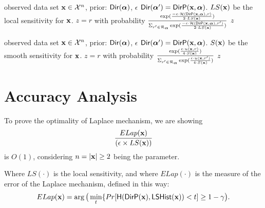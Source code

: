 \documentclass{article}
\begin{document}
%
%
%
%
%
  \begin{algorithm}
  \caption{$\lexpmech$}
  \label{mech:lexpmech}
  \begin{algorithmic}
   observed data set $\textbf{x} \in \mathcal{X}^n$, prior: $\mathsf{Dir}(\boldsymbol{\alpha})$, $\epsilon$
  \STATE {} $\mathsf{Dir}(\boldsymbol{\alpha}')= \mathsf{DirP}(\textbf{x},\boldsymbol{\alpha})$.
  \STATE {} $LS(\textbf{x})$ be the local sensitivity for $\textbf{x}$.
  \STATE {} $z=r$ with probability $\frac
  {\exp(\frac{-\epsilon\cdot \mathcal{H}(\mathsf{DirP}(\textbf{x},\boldsymbol{\alpha}), r)}{2\cdot LS(\textbf{x})})}
{\Sigma_{r' \in \mathcal{R}_{\boldsymbol{\alpha}}}\exp(\frac{-\epsilon\cdot \mathcal{H}(\mathsf{DirP}(\textbf{x},\boldsymbol{\alpha}), r')}{2\cdot LS(\textbf{x})})}$
 $z$
  \end{algorithmic}
  \end{algorithm}
%
%
  \begin{algorithm}
  \caption{$\hexpmech$}
  \label{mech:sexpmech}
  \begin{algorithmic}
  \STATE observed data set $\textbf{x} \in \mathcal{X}^n$, prior: $\mathsf{Dir}(\boldsymbol{\alpha})$, $\epsilon$
  \STATE {} $\mathsf{Dir}(\boldsymbol{\alpha}')= \mathsf{DirP}(\textbf{x},\boldsymbol{\alpha})$.   
  \STATE {} $S(\textbf{x})$ be the smooth sensitivity for $\textbf{x}$.
  \STATE {} $z=r$ with probability $\frac{\exp(\frac{\epsilon\cdot u(\textbf{x}, {r})}{4\cdot S(\textbf{x})})}{\Sigma_{r' \in \mathcal{R}_{\boldsymbol{\alpha}}}\exp(\frac{\epsilon\cdot u(\textbf{x}, r')}{4\cdot S(\textbf{x})})}$
 $z$
  \end{algorithmic}
\end{algorithm}



\clearpage
\section{Accuracy Analysis}
{\color{red}
\begin{thm}
To prove the optimality of Laplace mechanism, we are showing 
\[
\frac{ELap(\textbf{x})}{(\epsilon \times LS(\textbf{x}))}
\]
is {\color{red}$O(1)$}, considering $n=|\textbf{x}| \geq 2$ being the parameter.

Where $LS(\cdot)$ is the local sensitivity, and where $ELap(\cdot)$ is the measure of the error of the Laplace mechanism, defined in this way:
 \[
ELap(\textbf{x}) = \arg\big( \min\limits_{t}\{Pr[\mathsf{H}(\mathsf{DirP}(\textbf{x}), \mathsf{LSHist}(\textbf{x}))< t] \geq 1 - \gamma \big).
\]
\end{thm}
}
\end{document}

